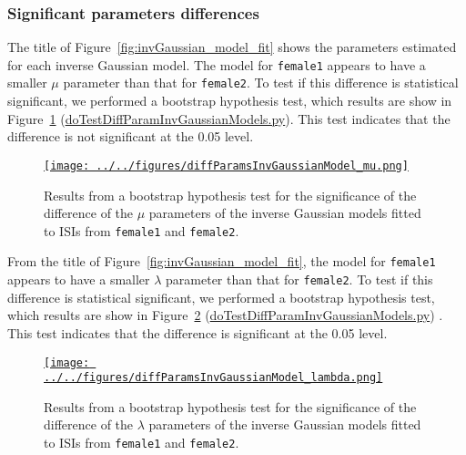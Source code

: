 \documentclass[10pt]{article}
\begin{document}
\subsubsection{Significant parameters differences}

The title of Figure~\ref{fig:invGaussian_model_fit} shows the parameters
estimated for each inverse Gaussian model. The model for \texttt{female1} appears to
have a smaller $\mu$ parameter than that for \texttt{female2}. To test if this
difference is statistical significant, we performed a bootstrap hypothesis
test, which results are show in Figure~\ref{fig:diffMuInvGaussianModel_fit}
(\href{https://github.com/joacorapela/singleNeuronSpikesAnalysisTutorial/blob/master/code/scripts/doTestDiffParamInvGaussianModels.py}{doTestDiffParamInvGaussianModels.py}).
This test indicates that the difference is not significant at the 0.05 level.

\begin{figure}
    \href{http://www.gatsby.ucl.ac.uk/~rapela/singleNeuronSpikesAnalysisTutorial/figures/diffParamsInvGaussianModel_mu.html}{\texttt{[image: ../../figures/diffParamsInvGaussianModel\_mu.png]}}
    \caption{Results from a bootstrap hypothesis test for the significance of the difference of the $\mu$ parameters of the inverse Gaussian models fitted to ISIs from \texttt{female1} and \texttt{female2}.}
    \label{fig:diffMuInvGaussianModel_fit}
\end{figure}

From the title of Figure~\ref{fig:invGaussian_model_fit}, the model for
\texttt{female1} appears to have a smaller $\lambda$ parameter than that for
\texttt{female2}. To test if this difference is statistical significant, we
performed a bootstrap hypothesis test, which results are show in
Figure~\ref{fig:diffLambdaInvGaussianModel_fit} (\href{https://github.com/joacorapela/singleNeuronSpikesAnalysisTutorial/blob/master/code/scripts/doTestDiffParamInvGaussianModels.py}{doTestDiffParamInvGaussianModels.py}) . This test indicates that the
difference is significant at the 0.05 level.

\begin{figure}
    \href{http://www.gatsby.ucl.ac.uk/~rapela/singleNeuronSpikesAnalysisTutorial/figures/diffParamsInvGaussianModel_lambda.html}{\texttt{[image: ../../figures/diffParamsInvGaussianModel\_lambda.png]}}
    \caption{Results from a bootstrap hypothesis test for the significance of the difference of the $\lambda$ parameters of the inverse Gaussian models fitted to ISIs from \texttt{female1} and \texttt{female2}.}
    \label{fig:diffLambdaInvGaussianModel_fit}
\end{figure}
\end{document}

